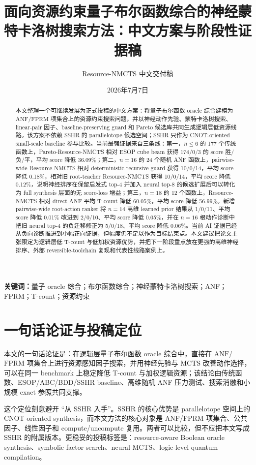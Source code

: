 \documentclass[UTF8,fontset=macnew,11pt]{ctexart}
\title{面向资源约束量子布尔函数综合的神经蒙特卡洛树搜索方法：中文方案与阶段性证据稿}
\author{Resource-NMCTS 中文交付稿}
\date{2026年7月7日}
\newcommand{\method}{Resource-NMCTS}
\newcommand{\pareto}{Pareto-Resource-NMCTS}
\newcommand{\anf}{\ensuremath{\mathrm{ANF}}}
\newcommand{\fprm}{\ensuremath{\mathrm{FPRM}}}
\newcommand{\mcts}{\ensuremath{\mathrm{MCTS}}}
\begin{document}
\maketitle

\begin{abstract}
本文整理一个可继续发展为正式投稿的中文方案：将量子布尔函数 oracle 综合建模为 \anf{}/\fprm{} 项集合上的资源约束搜索问题，并以神经动作先验、蒙特卡洛树搜索、linear-pair 因子、baseline-preserving guard 和 Pareto 候选库共同生成逻辑层低资源线路。该方案不依赖 SSHR 的 parallelotope 候选空间；SSHR 只作为 CNOT-oriented small-scale baseline 参与比较。当前最强证据来自三条线：第一，$n\leq6$ 的 177 个传统函数上，\pareto{} 相对 ESOP cube beam 获得 174/0/3 的 score 胜/负/平，平均 score 降低 36.09\%；第二，$n=16$ 的 24 个随机 ANF 函数上，pairwise-wide \method{} 相对 deterministic recursive guard 获得 10/0/14，平均 score 降低 0.18\%，相对旧 root-teacher \method{} 获得 10/0/14，平均 score 降低 0.12\%，说明神经排序在保留启发式 top-4 并加入 neural top-8 的候选扩展后可以转化为 full synthesis 层面的无 score-loss 增益；第三，$n=18$ 的 12 个函数上，\method{} 相对 direct ANF 平均 T-count 降低 60.05\%，平均 score 降低 56.99\%。新增 pairwise-wide root-action ranker 将 $n=14$ 高维 learned prior 结果从 1/0/11、平均 score 降低 0.01\% 改进到 2/0/10、平均 score 降低 0.05\%，并在 $n=16$ 根动作诊断中把旧 neural top-4 的负迁移修正为 5/0/18、平均 score 降低 0.06\%。当前 AI 证据已经从负向诊断推进到小幅正向证据，但幅度仍不足以作为目标结束点。本文建议把论文主张限定为逻辑层低 T-count 与低加权资源优势，并把下一阶段重点放在更强的高维神经排序、外部 reversible-toolchain 复现和代表性线路案例上。
\end{abstract}

\noindent\textbf{关键词：}量子 oracle 综合；布尔函数综合；神经蒙特卡洛树搜索；ANF；FPRM；T-count；资源约束

\section{一句话论证与投稿定位}

本文的一句话论证是：在逻辑层量子布尔函数 oracle 综合中，直接在 \anf{}/\fprm{} 项集合上进行资源感知因子搜索，并用神经先验与 \mcts{} 改善动作选择，可以在同一 benchmark 上稳定降低 T-count 与加权逻辑资源；该结论由传统函数、ESOP/ABC/BDD/SSHR baseline、高维随机 ANF 压力测试、搜索消融和小规模 exact 参照共同支撑。

这个定位刻意避开 ``从 SSHR 入手''。SSHR 的核心优势是 parallelotope 空间上的 CNOT-oriented synthesis，而本文方法的核心对象是 ANF/FPRM 项集合、公共因子、线性因子和 compute/uncompute 复用。两者可以比较，但不应把本文写成 SSHR 的附属版本。更稳妥的投稿标签是：resource-aware Boolean oracle synthesis、symbolic factor search、neural MCTS、logic-level quantum compilation。
\end{document}
